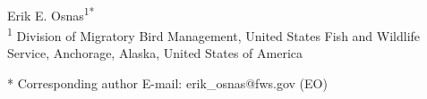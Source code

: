 \documentclass[
  10pt,
  letterpaper,
]{article}
\begin{document}
\vspace*{0.2in}

\begin{flushleft}
{\Large
\textbf{} %
}
\newline
\\
Erik E. Osnas\textsuperscript{1*}
\\
\bigskip
\textsuperscript{1} Division of Migratory Bird Management, United States Fish and Wildlife Service, Anchorage, Alaska, United States of America 
\bigskip

* Corresponding author \newline
E-mail: erik\_osnas@fws.gov (EO)

\end{flushleft}
\end{document}
